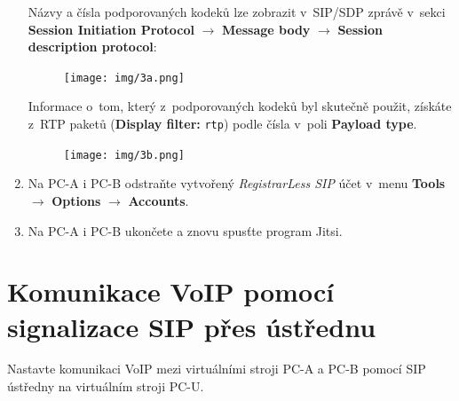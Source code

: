 \begin{enumerate}
Názvy a čísla podporovaných kodeků lze zobrazit v SIP/SDP zprávě v sekci {\bf Session Initiation Protocol} $\rightarrow$ {\bf Message body} $\rightarrow$ {\bf Session description protocol}:
\begin{figure}[H]
  \centering
  \texttt{[image: img/3a.png]}
\end{figure}

\noindent Informace o~tom, který z podporovaných kodeků byl skutečně použit, získáte z RTP paketů (\textbf{Display filter:} \texttt{rtp}) podle čísla v poli {\bf Payload type}.
\begin{figure}[H]
  \centering
  \texttt{[image: img/3b.png]}
\end{figure}


    \item Na PC-A i PC-B odstraňte vytvořený \emph{RegistrarLess SIP} účet v~menu {\bf Tools} $\rightarrow$ {\bf Options} $\rightarrow$ {\bf Accounts}.
    \item Na PC-A i PC-B ukončete a znovu spusťte program Jitsi.
\end{enumerate}

\section{Komunikace VoIP pomocí signalizace SIP přes ústřednu}
Nastavte komunikaci VoIP mezi virtuálními stroji PC-A a PC-B pomocí SIP ústředny na virtuálním stroji PC-U.

